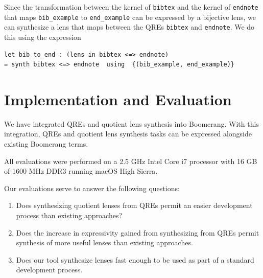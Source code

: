 \documentclass[acmsmall,review,anonymous]{acmart}
\newcommand{\cd}[1]{\lstinline[backgroundcolor=\color{white}]$#1$}
\begin{document}
Since the transformation between the kernel of \cd{bibtex} and the kernel of
\cd{endnote} that maps \cd{bib_example} to \cd{end_example} can be
expressed by a bijective lens, we can synthesize a lens that maps between the
QREs \cd{bibtex} and \cd{endnote}. We do this using the expression

\begin{lstlisting}
let bib_to_end : (lens in bibtex <=> endnote)
= synth bibtex <=> endnote  using  {(bib_example, end_example)}
\end{lstlisting}

\section{Implementation and Evaluation}
\label{impl}


We have integrated QREs and quotient lens synthesis into Boomerang. With this
integration, QREs and quotient lens synthesis tasks can be expressed alongside
existing Boomerang terms.

All evaluations were performed on a 2.5 GHz Intel Core i7 processor with 16 GB
of 1600 MHz DDR3 running macOS High Sierra.

Our evaluations serve to answer the following questions:
\begin{enumerate}
\item Does synthesizing quotient lenses from QREs permit an easier development
  process than existing approaches?
  
\item Does the increase in expressivity gained from synthesizing from QREs
  permit synthesis of more useful lenses than existing approaches.
  
\item Does our tool synthesize lenses fast enough to be used as part of a
  standard development process.
\end{enumerate}
\end{document}
